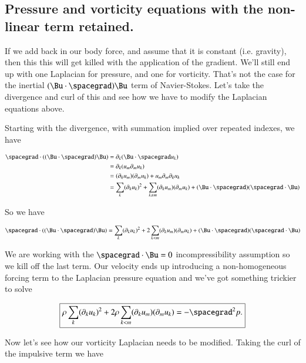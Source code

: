 \subsection{Pressure and vorticity equations with the non-linear term retained.}

If we add back in our body force, and assume that it is constant (i.e. gravity), then this this will get killed with the application of the gradient.  We'll still end up with one Laplacian for pressure, and one for vorticity.  That's not the case for the inertial $(\Bu \cdot \spacegrad) \Bu$ term of Navier-Stokes.  Let's take the divergence and curl of this and see how we have to modify the Laplacian equations above.

Starting with the divergence, with summation implied over repeated indexes, we have

\begin{align*}
\spacegrad \cdot ((\Bu \cdot \spacegrad) \Bu)
&=
\partial_k ( \Bu \cdot \spacegrad u_k ) \\
&=
\partial_k ( u_m \partial_m u_k ) \\
&=
(\partial_k u_m) (\partial_m u_k ) 
+ u_m \partial_m \partial_k u_k \\
&=
\sum_k (\partial_k u_k)^2
+
\sum_{k \ne m} (\partial_k u_m) (\partial_m u_k ) 
+ (\Bu \cdot \spacegrad) ( \spacegrad \cdot \Bu )
\end{align*}

So we have

\begin{equation}\label{eqn:inclinedFlowWithoutConstantHeightAssumption:480}
\spacegrad \cdot ((\Bu \cdot \spacegrad) \Bu)
=
\sum_k (\partial_k u_k)^2
+
2 \sum_{k < m} (\partial_k u_m) (\partial_m u_k ) 
+ (\Bu \cdot \spacegrad) ( \spacegrad \cdot \Bu )
\end{equation}

We are working with the $\spacegrad \cdot \Bu = 0$ incompressibility assumption so we kill off the last term.  Our velocity ends up introducing a non-homogeneous forcing term to the Laplacian pressure equation and we've got something trickier to solve

\begin{equation}\label{eqn:inclinedFlowWithoutConstantHeightAssumption:500}
\boxed{
\rho \sum_k (\partial_k u_k)^2
+
2 \rho \sum_{k < m} (\partial_k u_m) (\partial_m u_k ) 
=
-\spacegrad^2 p.
}
\end{equation}

Now let's see how our vorticity Laplacian needs to be modified.  Taking the curl of the impulsive term we have

